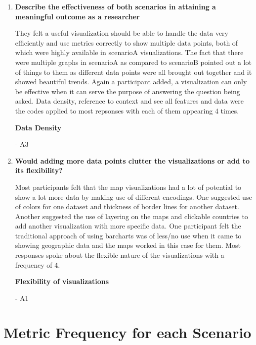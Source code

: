 \documentclass[seploa]{beavtex}
\begin{document}
\begin{enumerate}
\item \textbf{Describe the effectiveness of both scenarios in attaining a meaningful outcome as a researcher}

They felt a useful visualization should be able to handle the data very efficiently and use metrics correctly to show multiple data points, both of which were highly available in scenarioA visualizations. The fact that there were multiple graphs in scenarioA as compared to scenarioB pointed out a lot of things to them as different data points were all brought out together and it showed beautiful trends. Again a participant added, a visualization can only be effective when it can serve the purpose of answering the question being asked. Data density, reference to context and see all features and data were the codes applied to most repsonses with each of them appearing 4 times.

\textbf{Data Density}

{\em {}} - A3

\item \textbf{Would adding more data points clutter the visualizations or add to its flexibility?}

Most participants felt that the map visualizations had a lot of potential to show a lot more data by making use of different encodings. One suggested use of colors for one dataset and thickness of border lines for another dataset. Another suggested the use of layering on the maps and clickable countries to add another visualization with more specific data. One participant felt the traditional approach of using barcharts was of less/no use when it came to showing geographic data and the maps worked in this case for them. Most responses spoke about the flexible nature of the visualizations with a frequency of 4.

\textbf{Flexibility of visualizations}

{\em {}} - A1
\end{enumerate}
\section{Metric Frequency for each Scenario}
\end{document}
